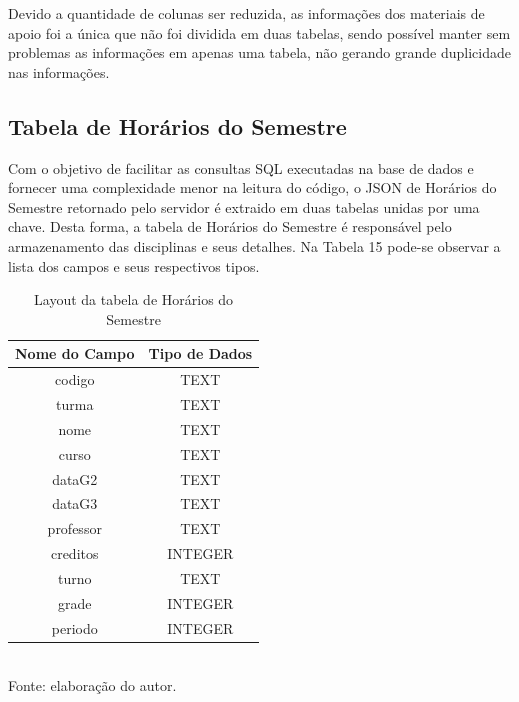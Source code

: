 Devido a quantidade de colunas ser reduzida, as informações dos materiais de apoio foi a única que não foi dividida em duas tabelas, sendo possível manter sem problemas as informações em apenas uma tabela, não gerando grande duplicidade nas informações.

\subsection{Tabela de Horários do Semestre}
Com o objetivo de facilitar as consultas SQL executadas na base de dados e fornecer uma complexidade menor na leitura do código, o JSON de Horários do Semestre retornado pelo servidor é extraido em duas tabelas unidas por uma chave. Desta forma, a tabela de Horários do Semestre é responsável pelo armazenamento das disciplinas e seus detalhes. Na Tabela 15 pode-se observar a lista dos campos e seus respectivos tipos.

\begin{table}[!hbt]
\centering
\caption[Aplicação - Tabela de Horários do Semestre]{Layout da tabela de Horários do Semestre}
\vspace{3mm}
\begin{tabular}{c|c}\hline
\textbf{Nome do Campo} & \textbf{Tipo de Dados} \\ \hline
codigo                 & TEXT                   \\ \hline
turma                  & TEXT                   \\ \hline
nome                   & TEXT                   \\ \hline
curso                  & TEXT                   \\ \hline
dataG2                 & TEXT                   \\ \hline
dataG3                 & TEXT                   \\ \hline
professor              & TEXT                   \\ \hline
creditos               & INTEGER                \\ \hline
turno                  & TEXT                   \\ \hline
grade                  & INTEGER                \\ \hline
periodo                & INTEGER                \\ \hline
\end{tabular}
\\ Fonte: elaboração do autor.
\end{table}

